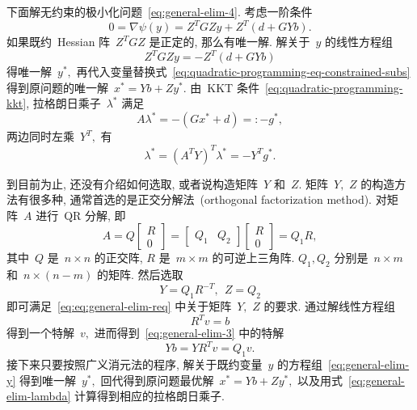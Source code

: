 下面解无约束的极小化问题~\eqref{eq:general-elim-4}. 考虑一阶条件
\begin{equation}
\label{eq:general-elim-5}
0 = \nabla \psi ({y}) = Z^T G Z {y} + Z^T \left( {d} + G Y {b} \right).
\end{equation}
如果既约~Hessian 阵~$Z^T G Z$ 是正定的, 那么有唯一解. 解关于~${y}$ 的线性方程组
\begin{equation}
\label{eq:general-elim-y}
Z^T G Z {y} = - Z^T \left( {d} + G Y {b} \right)
\end{equation}
得唯一解~${y}^*,$ 再代入变量替换式~\eqref{eq:quadratic-programming-eq-constrained-subs} 得到原问题的唯一解~${x}^* = Y {b} + Z {y}^*.$ 由~KKT 条件~\eqref{eq:quadratic-programming-kkt}, 拉格朗日乘子~${\lambda}^*$ 满足
\begin{equation}
\label{eq:general-elim-lagrange}
A {\lambda}^* = -\left( G {x}^* + {d} \right) =: - {g}^*,
\end{equation}
两边同时左乘~$Y^T,$ 有
\begin{equation}
\label{eq:general-elim-lambda}
{\lambda}^* = \left( A^T Y \right)^T {\lambda}^* = -Y^T {g}^*.
\end{equation}

到目前为止, 还没有介绍如何选取, 或者说构造矩阵~$Y$ 和~$Z.$ 矩阵~$Y,$ $Z$ 的构造方法有很多种, 通常首选的是正交分解法~(orthogonal factorization method). 对矩阵~$A$ 进行~QR 分解, 即
\begin{equation}
\label{eq:quadratic-programming-qr-decomp-1}
A = Q \begin{bmatrix} R \\ 0 \end{bmatrix} = \begin{bmatrix} Q_1 & Q_2 \end{bmatrix} \begin{bmatrix} R \\ 0 \end{bmatrix} = Q_1 R,
\end{equation}
其中~$Q$ 是~$n \times n$ 的正交阵, $R$ 是~$m \times m$ 的可逆上三角阵. $Q_1, Q_2$ 分别是~$n \times m$ 和~$n \times (n - m)$ 的矩阵. 然后选取
\begin{equation}
\label{eq:quadratic-programming-qr-decomp-2}
Y = Q_1 R^{-T}, ~~ Z = Q_2
\end{equation}
即可满足~\eqref{eq:eq:general-elim-req} 中关于矩阵~$Y,$ $Z$ 的要求. 通过解线性方程组
\begin{equation*}
R^T {v} = {b}
\end{equation*}
得到一个特解~${v},$ 进而得到~\eqref{eq:general-elim-3} 中的特解
\begin{equation*}
Y {b} = Y R^T {v} = Q_1 {v}.
\end{equation*}
接下来只要按照广义消元法的程序, 解关于既约变量~${y}$ 的方程组~\eqref{eq:general-elim-y} 得到唯一解~${y}^*,$ 回代得到原问题最优解~${x}^* = Y {b} + Z {y}^*,$ 
以及用式~\eqref{eq:general-elim-lambda} 计算得到相应的拉格朗日乘子.

